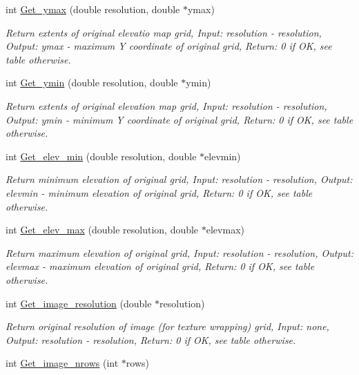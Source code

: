 \begin{CompactItemize}
int \hyperlink{GisApi_8C_a51}{Get\_\-ymax} (double resolution, double $\ast$ymax)
\begin{CompactList}\small\item\em Return extents of original elevatio map grid, Input: resolution - resolution, Output: ymax - maximum Y coordinate of original grid, Return: 0 if OK, see table otherwise. \item\end{CompactList}\item 
int \hyperlink{GisApi_8C_a52}{Get\_\-ymin} (double resolution, double $\ast$ymin)
\begin{CompactList}\small\item\em Return extents of original elevation map grid, Input: resolution - resolution, Output: ymin - minimum Y coordinate of original grid, Return: 0 if OK, see table otherwise. \item\end{CompactList}\item 
int \hyperlink{GisApi_8C_a53}{Get\_\-elev\_\-min} (double resolution, double $\ast$elevmin)
\begin{CompactList}\small\item\em Return minimum elevation of original grid, Input: resolution - resolution, Output: elevmin - minimum elevation of original grid, Return: 0 if OK, see table otherwise. \item\end{CompactList}\item 
int \hyperlink{GisApi_8C_a54}{Get\_\-elev\_\-max} (double resolution, double $\ast$elevmax)
\begin{CompactList}\small\item\em Return maximum elevation of original grid, Input: resolution - resolution, Output: elevmax - maximum elevation of original grid, Return: 0 if OK, see table otherwise. \item\end{CompactList}\item 
int \hyperlink{GisApi_8C_a55}{Get\_\-image\_\-resolution} (double $\ast$resolution)
\begin{CompactList}\small\item\em Return original resolution of image (for texture wrapping) grid, Input: none, Output: resolution - resolution, Return: 0 if OK, see table otherwise. \item\end{CompactList}\item 
int \hyperlink{GisApi_8C_a56}{Get\_\-image\_\-nrows} (int $\ast$rows)

\end{CompactItemize}
